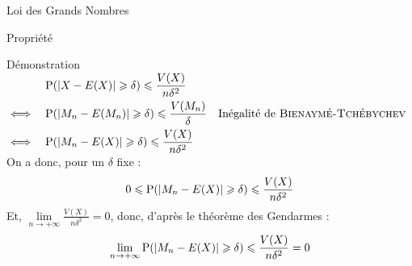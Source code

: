 \documentclass{cours}
\begin{document}
\begin{Gpartie}{Loi des Grands Nombres}
\begin{Spartie}{Propriété}
\begin{SSpartie}{Démonstration}
                $\begin{aligned}[t]
                    &\quad \mathrm{P}(\rvert X-E(X)\rvert\geqslant\delta)\leqslant\frac{V(X)}{n\delta^2} \\
                    \iff&\quad\mathrm{P}(\lvert M_n-E(M_n)\rvert\geqslant\delta)\leqslant\frac{V(M_n)}{\delta}\quad\text{Inégalité de \textsc{Bienaymé-Tchébychev}} \\
                    \iff&\quad\mathrm{P}(\lvert M_n-E(X)\rvert\geqslant\delta)\leqslant\frac{V(X)}{n\delta^2}
                \end{aligned}$
                On a donc, pour un $\delta$ fixe : \[0\leqslant\mathrm{P}(\lvert M_n-E(X)\rvert\geqslant\delta)\leqslant\frac{V(X)}{n\delta^2}\]
                Et, $\lim\limits_{n\to +\infty}\frac{V(X)}{n\delta^2}=0$, donc, d'après le théorème des Gendarmes : \[\lim\limits_{n\to +\infty}\mathrm{P}(\lvert M_n-E(X)\rvert\geqslant\delta)\leqslant\frac{V(X)}{n\delta^2}=0\]
            \end{SSpartie}
        \end{Spartie}
    \end{Gpartie}
\end{document}
